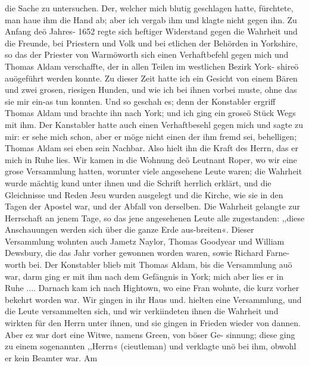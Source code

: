 die Sache zu untersuchen. Der, welcher mich blutig geschlagen
hatte, fürchtete, man haue ihm die Hand ab; aber ich vergab
ihm und klagte nicht gegen ihn.
Zu Anfang deö Jahres- 1652 regte sich heftiger Widerstand
gegen die Wahrheit und die Freunde, bei Priestern und Volk
und bei etlichen der Behörden in Yorkshire, so das der Priester
von Warmöworth sich einen Verhaftbefehl gegen mich und Thomas
Aldam verschaffte, der in allen Teilen im westlichen Bezirk York-
shireö auögeführt werden konnte. Zu dieser Zeit hatte ich ein
Gesicht von einem Bären und zwei grosen, riesigen Hunden, und
wie ich bei ihnen vorbei muste, ohne das sie mir ein-as tun
konnten. Und so geschah es; denn der Konstabler ergriff Thomas
Aldam und brachte ihn nach York; und ich ging ein groseö Stück
Wegs mit ihm. Der Kanstabler hatte auch einen Verhaftbesehl
gegen mich und sagte zu mir: er sehe mich schon, aber er möge
nicht einen der ihm fremd sei, behelligen; Thomas Aldam sei
eben sein Nachbar. Also hielt ihn die Kraft des Herrn, das er
mich in Ruhe lies. Wir kamen in die Wohnung deö Leutnant
Roper, wo wir eine grose Versammlung hatten, worunter viele
angesehene Leute waren; die Wahrheit wurde mächtig kund
unter ihnen und die Schrift herrlich erklärt, und die Gleichnisse
und Reden Jesu wurden ausgelegt und die Kirche, wie sie in den
Tagen der Apostel war, und der Abfall von derselben. Die
Wahrheit gelangte zur Herrschaft an jenem Tage, so das jene
angesehenen Leute alle zugestanden: ,,diese Anschauungen werden
sich über die ganze Erde aus-breiten«. Dieser Versammlung
wohnten auch Jametz Naylor, Thomas Goodyear und William
Dewsbury, die das Jahr vorher gewonnen worden waren, sowie
Richard Farne-worth bei. Der Konstabler blieb mit Thomas
Aldam, bis die Versammlung auö war, darm ging er mit ihm
nach dem Gefängnis in York; mich aber lies er in Ruhe ....
Darnach kam ich nach Hightown, wo eine Fran wohnte, die
kurz vorher bekehrt worden war. Wir gingen in ihr Haus und.
hielten eine Versammlung, und die Leute versammelten sich, und
wir verkiindeten ihnen die Wahrheit und wirkten für den Herrn
unter ihnen, und sie gingen in Frieden wieder von dannen.
Aber ez war dort eine Witwe, namens Green, von böser Ge-
sinnung; diese ging zu einem sogenannten ,,Herrn« (cieutleman)
und verklagte unö bei ihm, obwohl er kein Beamter war. Am


